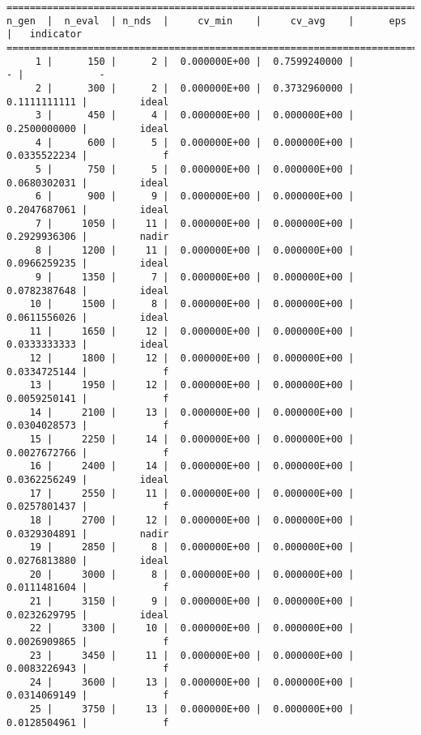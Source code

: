 \documentclass[
  authoryear,
  preprint,
  3p]{elsarticle}
\begin{document}
\begin{verbatim}
==========================================================================================
n_gen  |  n_eval  | n_nds  |     cv_min    |     cv_avg    |      eps      |   indicator  
==========================================================================================
     1 |      150 |      2 |  0.000000E+00 |  0.7599240000 |             - |             -
     2 |      300 |      2 |  0.000000E+00 |  0.3732960000 |  0.1111111111 |         ideal
     3 |      450 |      4 |  0.000000E+00 |  0.000000E+00 |  0.2500000000 |         ideal
     4 |      600 |      5 |  0.000000E+00 |  0.000000E+00 |  0.0335522234 |             f
     5 |      750 |      5 |  0.000000E+00 |  0.000000E+00 |  0.0680302031 |         ideal
     6 |      900 |      9 |  0.000000E+00 |  0.000000E+00 |  0.2047687061 |         ideal
     7 |     1050 |     11 |  0.000000E+00 |  0.000000E+00 |  0.2929936306 |         nadir
     8 |     1200 |     11 |  0.000000E+00 |  0.000000E+00 |  0.0966259235 |         ideal
     9 |     1350 |      7 |  0.000000E+00 |  0.000000E+00 |  0.0782387648 |         ideal
    10 |     1500 |      8 |  0.000000E+00 |  0.000000E+00 |  0.0611556026 |         ideal
    11 |     1650 |     12 |  0.000000E+00 |  0.000000E+00 |  0.0333333333 |         ideal
    12 |     1800 |     12 |  0.000000E+00 |  0.000000E+00 |  0.0334725144 |             f
    13 |     1950 |     12 |  0.000000E+00 |  0.000000E+00 |  0.0059250141 |             f
    14 |     2100 |     13 |  0.000000E+00 |  0.000000E+00 |  0.0304028573 |             f
    15 |     2250 |     14 |  0.000000E+00 |  0.000000E+00 |  0.0027672766 |             f
    16 |     2400 |     14 |  0.000000E+00 |  0.000000E+00 |  0.0362256249 |         ideal
    17 |     2550 |     11 |  0.000000E+00 |  0.000000E+00 |  0.0257801437 |             f
    18 |     2700 |     12 |  0.000000E+00 |  0.000000E+00 |  0.0329304891 |         nadir
    19 |     2850 |      8 |  0.000000E+00 |  0.000000E+00 |  0.0276813880 |         ideal
    20 |     3000 |      8 |  0.000000E+00 |  0.000000E+00 |  0.0111481604 |             f
    21 |     3150 |      9 |  0.000000E+00 |  0.000000E+00 |  0.0232629795 |         ideal
    22 |     3300 |     10 |  0.000000E+00 |  0.000000E+00 |  0.0026909865 |             f
    23 |     3450 |     11 |  0.000000E+00 |  0.000000E+00 |  0.0083226943 |             f
    24 |     3600 |     13 |  0.000000E+00 |  0.000000E+00 |  0.0314069149 |             f
    25 |     3750 |     13 |  0.000000E+00 |  0.000000E+00 |  0.0128504961 |             f

\end{verbatim}
\end{document}

